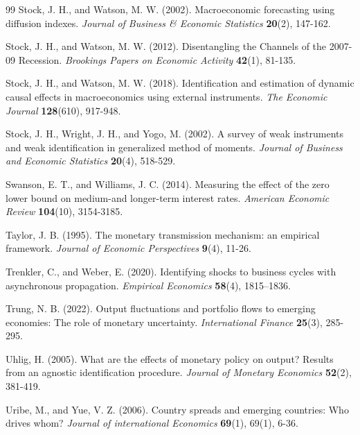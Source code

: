 \documentclass[12pt, reqno]{article}
\begin{document}
\begin{thebibliography}{99}
\bibitem{} \hypertarget{Stock and Watson (2002)}{}Stock, J. H., and Watson, M. W. (2002). Macroeconomic forecasting using diffusion indexes. \textit{Journal of Business \& Economic Statistics} \textbf{}\textbf{20}(2), 147-162.

\bibitem{} \hypertarget{Stock and Watson (2012)}{}Stock, J. H., and Watson, M. W. (2012). Disentangling the Channels of the 2007-09 Recession. \textit{Brookings Papers on Economic Activity} \textbf{}\textbf{42}(1), 81-135.

\bibitem{} \hypertarget{Stock and Watson (2018)}{}Stock, J. H., and Watson, M. W. (2018). Identification and estimation of dynamic causal effects in macroeconomics using external instruments. \textit{The Economic Journal} \textbf{128}(610), 917-948.

\bibitem{} \hypertarget{Stock et al. (2002)}{}Stock, J. H., Wright, J. H., and Yogo, M. (2002). A survey of weak instruments and weak identification in generalized method of moments. \textit{Journal of Business and Economic Statistics} \textbf{20}(4), 518-529. 

\bibitem{} \hypertarget{Swanson and Williams (2014)}{} Swanson, E. T., and Williams, J. C. (2014). Measuring the effect of the zero lower bound on medium-and longer-term interest rates. \textit{American Economic Review} \textbf{104}(10), 3154-3185.

\bibitem{} \hypertarget{Taylor (1995)}{}Taylor, J. B. (1995). The monetary transmission mechanism: an empirical framework. \textit{Journal of Economic Perspectives} \textbf{9}(4), 11-26.

\bibitem{} \hypertarget{Trenkler and Weber (2020)}{}
Trenkler, C., and Weber, E. (2020). Identifying shocks to business cycles with asynchronous propagation. \textit{Empirical Economics} \textbf{58}(4), 1815–1836.

\bibitem{} \hypertarget{Trung (2022)}{}Trung, N. B. (2022). Output fluctuations and portfolio flows to emerging economies: The role of monetary uncertainty. \textit{International Finance} \textbf{25}(3), 285-295.

\bibitem{} \hypertarget{Uhlig (2005)}{}Uhlig, H. (2005). What are the effects of monetary policy on output? Results from an agnostic identification procedure. \textit{Journal of Monetary Economics} \textbf{52}(2), 381-419.

\bibitem{} \hypertarget{Uribe and Yue (2006)}{}Uribe, M., and Yue, V. Z. (2006). Country spreads and emerging countries: Who drives whom? \textit{Journal of international Economics} \textbf{69}(1), 69(1), 6-36.


\end{thebibliography}
\end{document}

